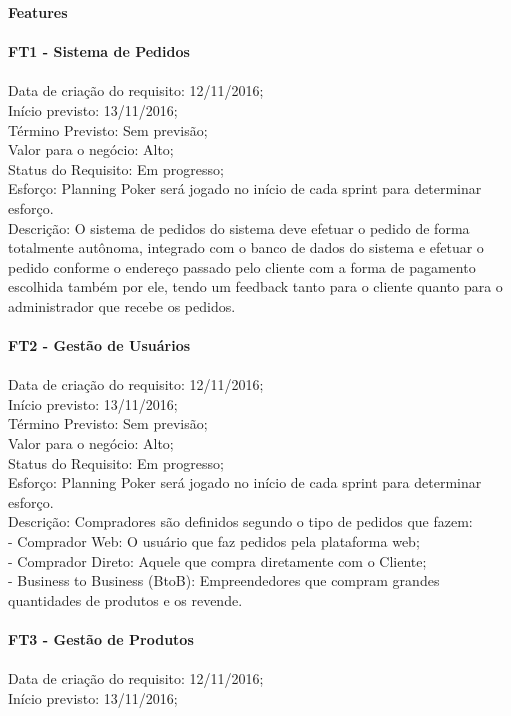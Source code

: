 \begin{apendicesenv}
\textbf{Features} \\
\\
\textbf{FT1 - Sistema de Pedidos}\\ \\
\tab Data de criação do requisito: 12/11/2016;\\
\tab Início previsto: 13/11/2016;\\
\tab Término Previsto: Sem previsão;\\
\tab Valor para o negócio: Alto;\\
\tab Status do Requisito: Em progresso;\\
\tab Esforço: Planning Poker será jogado no início de cada sprint para determinar esforço.\\
\tab Descrição:  O sistema de pedidos do sistema deve efetuar o pedido de forma totalmente autônoma, integrado com o banco de dados do sistema e efetuar o pedido conforme o endereço passado pelo cliente com a forma de pagamento escolhida também por ele, tendo um feedback tanto para o cliente quanto para o administrador que recebe os pedidos.\\
\\
\textbf{FT2 - Gestão de Usuários}\\ \\
\tab Data de criação do requisito: 12/11/2016;\\
\tab Início previsto: 13/11/2016;\\
\tab Término Previsto: Sem previsão;\\
\tab Valor para o negócio: Alto;\\
\tab Status do Requisito: Em progresso;\\
\tab Esforço: Planning Poker será jogado no início de cada sprint para determinar esforço.\\
\tab Descrição:  Compradores são definidos segundo o tipo de pedidos que fazem:\\
\tab - Comprador Web: O usuário que faz pedidos pela plataforma web;\\
\tab - Comprador Direto: Aquele que compra diretamente com o Cliente;\\
\tab - Business to Business (BtoB): Empreendedores que compram grandes quantidades de produtos e os revende.\\
\\
\textbf{FT3 - Gestão de Produtos }\\ \\
\tab Data de criação do requisito: 12/11/2016;\\
\tab Início previsto: 13/11/2016;\\

\end{apendicesenv}
